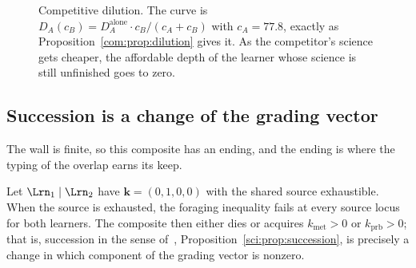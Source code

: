 \begin{figure}[t]
\centering
{}
\caption{Competitive dilution. The curve is $D_A(c_B) = D_A^{\text{alone}} \cdot
c_B/(c_A + c_B)$ with $c_A = 77.8$, exactly as Proposition~\ref{com:prop:dilution} gives it. As the
competitor's science gets cheaper, the affordable depth of the learner whose science is still
unfinished goes to zero.}
\label{com:fig:dilution}
\end{figure}

\subsection{Succession is a change of the grading vector}\label{com:S11.4}

The wall is finite, so this composite has an ending, and the ending is where the typing of the
overlap earns its keep.

\begin{proposition}\label{com:prop:succession}
Let $\Lrn_1 \mid \Lrn_2$ have $\mathbf{k} = (0,1,0,0)$ with the shared source exhaustible. When
the source is exhausted, the foraging inequality fails at every source locus for both learners.
The composite then either dies or acquires $k_{\mathrm{met}} > 0$ or $k_{\mathrm{prb}} > 0$;
that is, succession in the sense of~\chSci, Proposition~\ref{sci:prop:succession}, is precisely a change in which
component of the grading vector is nonzero.
\end{proposition}

